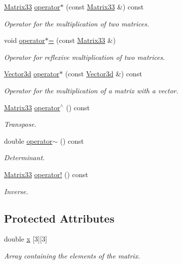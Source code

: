 \begin{DoxyCompactItemize}
$$\hyperlink{classMatrix33}{\-Matrix33} \hyperlink{classMatrix33_a525f14614255ff81c0cbab8060e8e065}{operator$\ast$} (const \hyperlink{classMatrix33}{\-Matrix33} \&) const 
\begin{DoxyCompactList}\small\item\em \-Operator for the multiplication of two matrices. \end{DoxyCompactList}\item 
void \hyperlink{classMatrix33_ac3937bdeb034cc83b4adcad16cd58a26}{operator$\ast$=} (const \hyperlink{classMatrix33}{\-Matrix33} \&)
\begin{DoxyCompactList}\small\item\em \-Operator for reflexive multiplication of two matrices. \end{DoxyCompactList}\item 
\hyperlink{classVector3d}{\-Vector3d} \hyperlink{classMatrix33_a601584a1edbaae7c6a2a2874605d6f61}{operator$\ast$} (const \hyperlink{classVector3d}{\-Vector3d} \&) const 
\begin{DoxyCompactList}\small\item\em \-Operator for the multiplication of a matrix with a vector. \end{DoxyCompactList}\item 
\hyperlink{classMatrix33}{\-Matrix33} \hyperlink{classMatrix33_ad4ab7b9674a44a297502282e1993ef54}{operator$^\wedge$} () const 
\begin{DoxyCompactList}\small\item\em \-Transpose. \end{DoxyCompactList}\item 
double \hyperlink{classMatrix33_a15b37caa6ab0d9f4a9f0d95846abd675}{operator$\sim$} () const 
\begin{DoxyCompactList}\small\item\em \-Determinant. \end{DoxyCompactList}\item 
\hyperlink{classMatrix33}{\-Matrix33} \hyperlink{classMatrix33_a1b822a20343a26b3c9bb7fd5c1247f37}{operator!} () const 
\begin{DoxyCompactList}\small\item\em \-Inverse. \end{DoxyCompactList}\end{DoxyCompactItemize}
\subsection*{\-Protected \-Attributes}
\begin{DoxyCompactItemize}
\item 
double \hyperlink{classMatrix33_af7f01fa466616eb7c8eda2e4d9f85cdd}{x} \mbox{[}3\mbox{]}\mbox{[}3\mbox{]}
\begin{DoxyCompactList}\small\item\em \-Array containing the elements of the matrix. \end{DoxyCompactList}\end{DoxyCompactItemize}


